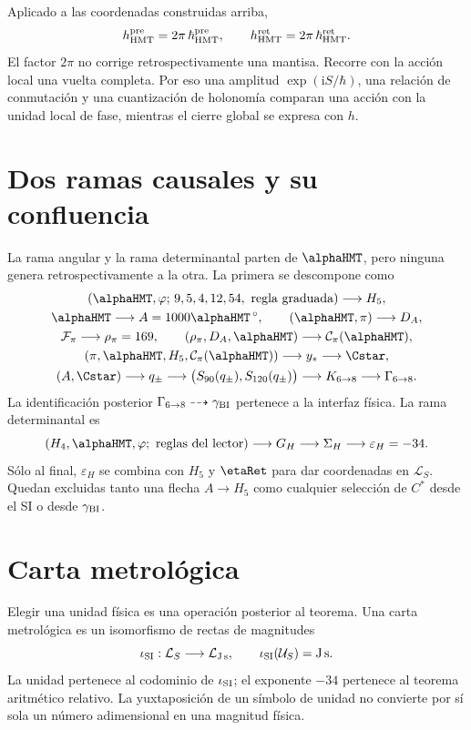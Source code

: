 Aplicado a las coordenadas construidas arriba,
\[
 h_{\rm HMT}^{\rm pre}
 =2\pi\,\hbar_{\rm HMT}^{\rm pre},\qquad
 h_{\rm HMT}^{\rm ret}
 =2\pi\,\hbar_{\rm HMT}^{\rm ret}.
\]
El factor \(2\pi\) no corrige retrospectivamente una mantisa. Recorre con la
acción local una vuelta completa. Por eso una amplitud
\(\exp(\mathrm iS/\hbar)\), una relación de conmutación y una cuantización
de holonomía comparan una acción con la unidad local de fase, mientras el
cierre global se expresa con \(h\).

\section{Dos ramas causales y su confluencia}

La rama angular y la rama determinantal parten de
\(\alphaHMT\), pero ninguna genera retrospectivamente a la otra. La primera
se descompone como
\[
\begin{gathered}
(\alphaHMT,\varphi;\,9,5,4,12,54,\text{ regla graduada})
\longrightarrow H_5,\\
\alphaHMT\longrightarrow A=1000\alphaHMT\,{}^\circ,
\qquad
(\alphaHMT,\pi)\longrightarrow D_A,\\
\mathcal F_\pi\longrightarrow\rho_\pi=169,\qquad
(\rho_\pi,D_A,\alphaHMT)\longrightarrow\mathcal C_\pi(\alphaHMT),\\
(\pi,\alphaHMT,H_5,\mathcal C_\pi(\alphaHMT))
\longrightarrow y_*\longrightarrow\Cstar,\\
(A,\Cstar)\longrightarrow q_\pm
\longrightarrow\bigl(S_{90}(q_\pm),S_{120}(q_\pm)\bigr)
\longrightarrow K_{6\to8}
\longrightarrow\Gamma_{6\to8}.
\end{gathered}
\]
La identificación posterior
\(\Gamma_{6\to8}\dashrightarrow\gamma_{\rm BI}\) pertenece a la interfaz
física. La rama determinantal es
\[
(H_4,\alphaHMT,\varphi;\text{ reglas del lector})
\longrightarrow G_H
\longrightarrow\Sigma_H
\longrightarrow\varepsilon_H=-34.
\]
Sólo al final, \(\varepsilon_H\) se combina con \(H_5\) y \(\etaRet\) para
dar coordenadas en \(\mathcal L_S\). Quedan excluidas tanto una flecha
\(A\to H_5\) como cualquier selección de \(C^*\) desde el SI o desde
\(\gamma_{\rm BI}\).

\section{Carta metrológica}

Elegir una unidad física es una operación posterior al teorema. Una carta
metrológica es un isomorfismo de rectas de magnitudes
\[
\iota_{\rm SI}:\mathcal L_S\longrightarrow\mathcal L_{\mathrm{J\,s}},
\qquad
\iota_{\rm SI}(\mathcal U_S)=\mathrm{J\,s}.
\]
La unidad pertenece al codominio de \(\iota_{\rm SI}\); el exponente
\(-34\) pertenece al teorema aritmético relativo. La yuxtaposición de un
símbolo de unidad no convierte por sí sola un número adimensional en una
magnitud física.

